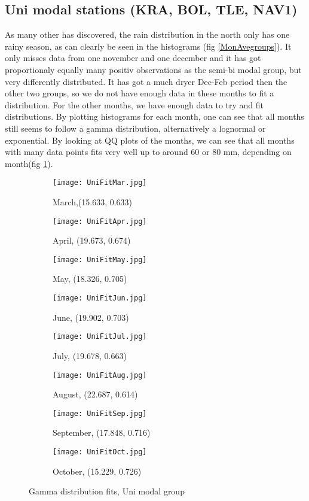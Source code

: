\documentclass{article}
\begin{document}
	\subsection{Uni modal stations (KRA, BOL, TLE, NAV1)}
	As many other has discovered, the rain distribution in the north only has one rainy season, as can clearly be seen in the histograms (fig \ref{MonAvegroups}). It only misses data from one november and one december and it has got proportionaly equally many positiv observations as the semi-bi modal group, but very differently distributed. It has got a much dryer Dec-Feb period then the other two groups, so we do not have enough data in these months to fit a distribution. For the other months, we have enough data to try and fit distributions. By plotting histograms for each month, one can see that all months still seems to follow a gamma distribution, alternatively a lognormal or exponential. By looking at QQ plots of the months, we can see that all months with many data points fits very well up to around 60 or 80 mm, depending on month(fig \ref{GammaFitUni}). 
	\begin{figure}[H]
		\ContinuedFloat*
		\centering
		\begin{subfigure}{0.5\textwidth}
			\centering
			\texttt{[image: UniFitMar.jpg]}
			\caption{March,(15.633, 0.633) }
			\end{subfigure}%
			\begin{subfigure}{0.5\textwidth}
			\centering
			\texttt{[image: UniFitApr.jpg]}
			\caption{April, (19.673, 0.674)}
		\end{subfigure}
			\begin{subfigure}{0.5\textwidth}
			\centering
			\texttt{[image: UniFitMay.jpg]}
			\caption{May, (18.326, 0.705)}
		\end{subfigure}%
			\begin{subfigure}{0.5\textwidth}
			\centering
			\texttt{[image: UniFitJun.jpg]}
			\caption{June, (19.902, 0.703) }
		\end{subfigure}
			\begin{subfigure}{0.5\textwidth}
			\centering
			\texttt{[image: UniFitJul.jpg]}
			\caption{July, (19.678, 0.663)}
		\end{subfigure}%
			\begin{subfigure}{0.5\textwidth}
			\centering
			\texttt{[image: UniFitAug.jpg]}
			\caption{August, (22.687, 0.614)}
		\end{subfigure}
			\begin{subfigure}{0.5\textwidth}
			\centering
			\texttt{[image: UniFitSep.jpg]}
			\caption{September, (17.848, 0.716)}
		\end{subfigure}%
			\begin{subfigure}{0.5\textwidth}
			\centering
			\texttt{[image: UniFitOct.jpg]}
			\caption{October, (15.229, 0.726)}
		\end{subfigure}
		\caption{Gamma distribution fits, Uni modal group}
		\label{GammaFitUni}
	\end{figure}
\end{document}
